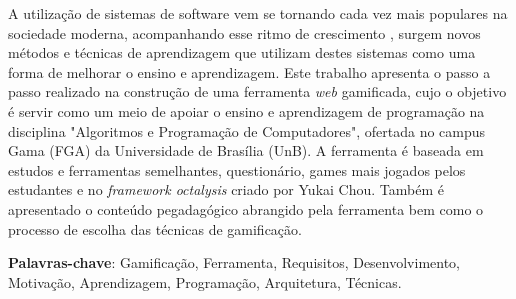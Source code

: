 \begin{resumo}

A utilização de sistemas de software vem se tornando cada vez mais populares na sociedade moderna, acompanhando esse ritmo de crescimento
, surgem novos métodos e técnicas de aprendizagem que utilizam destes sistemas como uma forma de melhorar o ensino e aprendizagem. Este trabalho 
apresenta o passo a passo realizado na construção de uma ferramenta \textit{web} gamificada, cujo o objetivo é servir como um meio
de apoiar o ensino e aprendizagem de programação na disciplina "Algoritmos e Programação de Computadores", ofertada no campus Gama (FGA) da 
Universidade de Brasília (UnB). A ferramenta é baseada em estudos e ferramentas semelhantes, questionário, games mais jogados 
pelos estudantes e no \textit{framework octalysis} criado por Yukai Chou. Também é apresentado o conteúdo pegadagógico abrangido pela ferramenta
bem como o processo de escolha das técnicas de gamificação.

 \vspace{\onelineskip}
    
 \noindent
 \textbf{Palavras-chave}: Gamificação, Ferramenta, Requisitos, Desenvolvimento, Motivação, Aprendizagem, Programação, Arquitetura, Técnicas.
\end{resumo}
